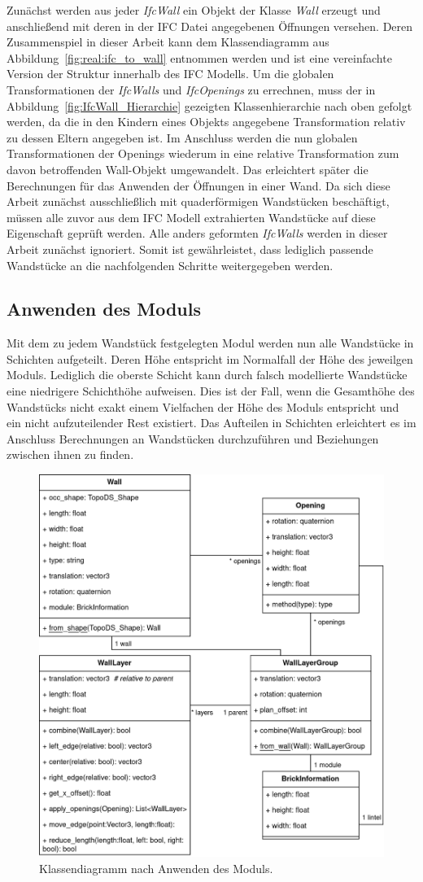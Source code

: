 Zunächst werden aus jeder \textit{IfcWall} ein Objekt der Klasse \textit{Wall} erzeugt und anschließend mit deren in der IFC Datei angegebenen Öffnungen versehen.
Deren Zusammenspiel in dieser Arbeit kann dem Klassendiagramm aus Abbildung~\ref{fig:real:ifc_to_wall} entnommen werden und ist eine vereinfachte Version der Struktur innerhalb des IFC Modells.
Um die globalen Transformationen der \textit{IfcWalls} und \textit{IfcOpenings} zu errechnen, muss der in Abbildung~\ref{fig:IfcWall_Hierarchie} gezeigten Klassenhierarchie nach oben gefolgt werden, da die in den Kindern eines Objekts angegebene Transformation relativ zu dessen Eltern angegeben ist.
Im Anschluss werden die nun globalen Transformationen der Openings wiederum in eine relative Transformation zum davon betroffenden Wall-Objekt umgewandelt.
Das erleichtert später die Berechnungen für das Anwenden der Öffnungen in einer Wand.
Da sich diese Arbeit zunächst ausschließlich mit quaderförmigen Wandstücken beschäftigt, müssen alle zuvor aus dem IFC Modell extrahierten Wandstücke auf diese Eigenschaft geprüft werden.
Alle anders geformten \textit{IfcWalls} werden in dieser Arbeit zunächst ignoriert.
Somit ist gewährleistet, dass lediglich passende Wandstücke an die nachfolgenden Schritte weitergegeben werden.

\subsection{Anwenden des Moduls}
Mit dem zu jedem Wandstück festgelegten Modul werden nun alle Wandstücke in Schichten aufgeteilt.
Deren Höhe entspricht im Normalfall der Höhe des jeweilgen Moduls.
Lediglich die oberste Schicht kann durch falsch modellierte Wandstücke eine niedrigere Schichthöhe aufweisen.
Dies ist der Fall, wenn die Gesamthöhe des Wandstücks nicht exakt einem Vielfachen der Höhe des Moduls entspricht und ein nicht aufzuteilender Rest existiert.
Das Aufteilen in Schichten erleichtert es im Anschluss Berechnungen an Wandstücken durchzuführen und Beziehungen zwischen ihnen zu finden.
\begin{figure}[hbt]
  \centering
  \includegraphics[width=0.7\columnwidth]{fig/klassendiagramm_apply_module.drawio.png}
  \caption{Klassendiagramm nach Anwenden des Moduls.}
  \label{fig:real:apply_module}
\end{figure}

